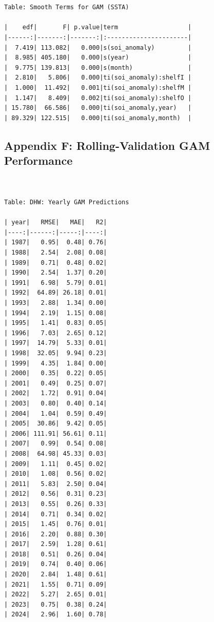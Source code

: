 \documentclass[letterpaper,9pt,twocolumn,twoside,]{pinp}
\begin{document}
\begin{ShadedResult}
\begin{verbatim}


Table: Smooth Terms for GAM (SSTA)

|    edf|       F| p.value|term                   |
|------:|-------:|-------:|:----------------------|
|  7.419| 113.082|   0.000|s(soi_anomaly)         |
|  8.985| 405.180|   0.000|s(year)                |
|  9.775| 139.813|   0.000|s(month)               |
|  2.810|   5.806|   0.000|ti(soi_anomaly):shelfI |
|  1.000|  11.492|   0.001|ti(soi_anomaly):shelfM |
|  1.147|   8.409|   0.002|ti(soi_anomaly):shelfO |
| 15.780|  66.586|   0.000|ti(soi_anomaly,year)   |
| 89.329| 122.515|   0.000|ti(soi_anomaly,month)  |

\end{verbatim}
\end{ShadedResult}

\subsection{Appendix F: Rolling-Validation GAM
Performance}\label{appendix-f-rolling-validation-gam-performance}

\begin{ShadedResult}
\begin{verbatim}


Table: DHW: Yearly GAM Predictions

| year|   RMSE|   MAE|   R2|
|----:|------:|-----:|----:|
| 1987|   0.95|  0.48| 0.76|
| 1988|   2.54|  2.08| 0.08|
| 1989|   0.71|  0.48| 0.02|
| 1990|   2.54|  1.37| 0.20|
| 1991|   6.98|  5.79| 0.01|
| 1992|  64.89| 26.18| 0.01|
| 1993|   2.88|  1.34| 0.00|
| 1994|   2.19|  1.15| 0.08|
| 1995|   1.41|  0.83| 0.05|
| 1996|   7.03|  2.65| 0.12|
| 1997|  14.79|  5.33| 0.01|
| 1998|  32.05|  9.94| 0.23|
| 1999|   4.35|  1.84| 0.00|
| 2000|   0.35|  0.22| 0.05|
| 2001|   0.49|  0.25| 0.07|
| 2002|   1.72|  0.91| 0.04|
| 2003|   0.80|  0.40| 0.14|
| 2004|   1.04|  0.59| 0.49|
| 2005|  30.86|  9.42| 0.05|
| 2006| 111.91| 56.61| 0.11|
| 2007|   0.99|  0.54| 0.08|
| 2008|  64.98| 45.33| 0.03|
| 2009|   1.11|  0.45| 0.02|
| 2010|   1.08|  0.56| 0.02|
| 2011|   5.83|  2.50| 0.04|
| 2012|   0.56|  0.31| 0.23|
| 2013|   0.55|  0.26| 0.33|
| 2014|   0.71|  0.34| 0.02|
| 2015|   1.45|  0.76| 0.01|
| 2016|   2.20|  0.88| 0.30|
| 2017|   2.59|  1.28| 0.61|
| 2018|   0.51|  0.26| 0.04|
| 2019|   0.74|  0.40| 0.06|
| 2020|   2.84|  1.48| 0.61|
| 2021|   1.55|  0.71| 0.09|
| 2022|   5.27|  2.65| 0.01|
| 2023|   0.75|  0.38| 0.24|
| 2024|   2.96|  1.60| 0.78|

\end{verbatim}
\end{ShadedResult}
\end{document}
